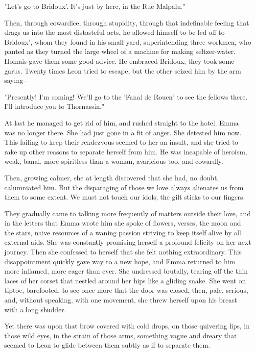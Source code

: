 \documentclass[11pt,twocolumn]{ltugboat}
\begin{document}
"Let's go to Bridoux'. It's just by here, in the Rue Malpalu."

Then, through cowardice, through stupidity, through that indefinable
feeling that drags us into the most distasteful acts, he allowed
himself to be led off to Bridoux', whom they found in his small yard,
superintending three workmen, who panted as they turned the large
wheel of a machine for making seltzer-water. Homais gave them some good
advice. He embraced Bridoux; they took some garus. Twenty times Leon
tried to escape, but the other seized him by the arm saying--

"Presently! I'm coming! We'll go to the 'Fanal de Rouen' to see the
fellows there. I'll introduce you to Thornassin."

At last he managed to get rid of him, and rushed straight to the hotel.
Emma was no longer there. She had just gone in a fit of anger. She
detested him now. This failing to keep their rendezvous seemed to her an
insult, and she tried to rake up other reasons to separate herself from
him. He was incapable of heroism, weak, banal, more spiritless than a
woman, avaricious too, and cowardly.

Then, growing calmer, she at length discovered that she had, no doubt,
calumniated him. But the disparaging of those we love always alienates
us from them to some extent. We must not touch our idols; the gilt
sticks to our fingers.

They gradually came to talking more frequently of matters outside their
love, and in the letters that Emma wrote him she spoke of flowers,
verses, the moon and the stars, naive resources of a waning passion
striving to keep itself alive by all external aids. She was constantly
promising herself a profound felicity on her next journey. Then
she confessed to herself that she felt nothing extraordinary. This
disappointment quickly gave way to a new hope, and Emma returned to him
more inflamed, more eager than ever. She undressed brutally, tearing off
the thin laces of her corset that nestled around her hips like a gliding
snake. She went on tiptoe, barefooted, to see once more that the
door was closed, then, pale, serious, and, without speaking, with one
movement, she threw herself upon his breast with a long shudder.

Yet there was upon that brow covered with cold drops, on those quivering
lips, in those wild eyes, in the strain of those arms, something vague
and dreary that seemed to Leon to glide between them subtly as if to
separate them.
\end{document}
